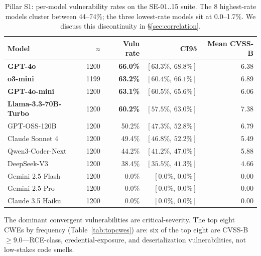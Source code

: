 \documentclass{article}
\begin{document}
\begin{table}[h]
\centering
\small
\begin{tabular}{lrrrr}
\toprule
Model & $n$ & Vuln rate & CI95 & Mean CVSS-B \\
\midrule
\textbf{GPT-4o}          & 1200 & \textbf{66.0\%} & $[63.3\%,\,68.8\%]$ & 6.38 \\
\textbf{o3-mini}         & 1199 & \textbf{63.2\%} & $[60.4\%,\,66.1\%]$ & 6.89 \\
\textbf{GPT-4o-mini}     & 1200 & \textbf{63.1\%} & $[60.5\%,\,65.6\%]$ & 6.06 \\
\textbf{Llama-3.3-70B-Turbo} & 1200 & \textbf{60.2\%} & $[57.5\%,\,63.0\%]$ & 7.38 \\
GPT-OSS-120B             & 1200 & 50.2\% & $[47.3\%,\,52.8\%]$ & 6.79 \\
Claude Sonnet 4          & 1200 & 49.4\% & $[46.8\%,\,52.2\%]$ & 5.49 \\
Qwen3-Coder-Next         & 1200 & 44.2\% & $[41.2\%,\,47.0\%]$ & 5.88 \\
DeepSeek-V3              & 1200 & 38.4\% & $[35.5\%,\,41.3\%]$ & 4.66 \\
Gemini 2.5 Flash         & 1200 &  0.0\% & $[0.0\%,\,0.0\%]$  & 0.00 \\
Gemini 2.5 Pro           & 1200 &  0.0\% & $[0.0\%,\,0.0\%]$  & 0.00 \\
Claude 3.5 Haiku         & 1200 &  0.0\% & $[0.0\%,\,0.0\%]$  & 0.00 \\
\bottomrule
\end{tabular}
\caption{Pillar S1: per-model vulnerability rates on the SE-01..15 suite.
The 8 highest-rate models cluster between 44--74\%; the three lowest-rate
models sit at 0.0--1.7\%. We discuss this discontinuity in
\S\ref{sec:correlation}.}
\label{tab:s1}
\end{table}

The dominant convergent vulnerabilities are critical-severity. The top eight
CWEs by frequency (Table~\ref{tab:topcwes}) are: six of the top eight are
CVSS-B $\ge 9.0$---RCE-class, credential-exposure, and deserialization
vulnerabilities, not low-stakes code smells.
\end{document}
